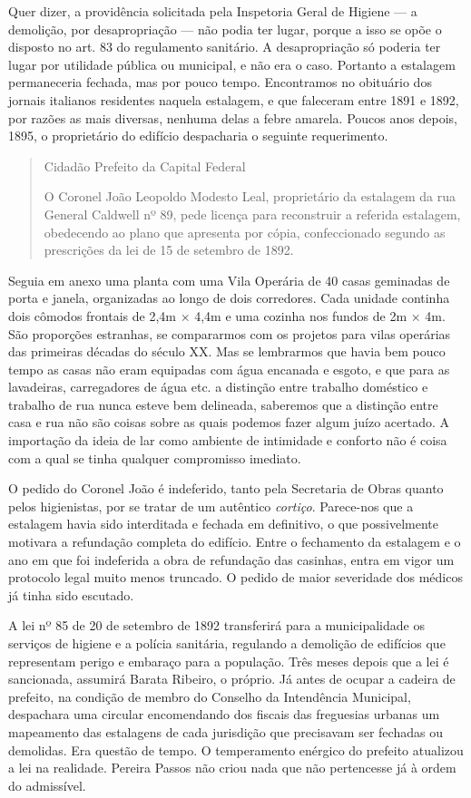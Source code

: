 Quer dizer, a providência solicitada pela Inspetoria Geral de Higiene ---
a demolição, por desapropriação --- não podia ter lugar, porque a isso se
opõe o disposto no art. 83 do regulamento sanitário. A desapropriação só
poderia ter lugar por utilidade pública ou municipal, e não era o caso.
Portanto a estalagem permaneceria fechada, mas por pouco tempo.
Encontramos no obituário dos jornais italianos residentes naquela
estalagem, e que faleceram entre 1891 e 1892, por razões as mais
diversas, nenhuma delas a febre amarela. Poucos anos depois, 1895, o
proprietário do edifício despacharia o seguinte requerimento.

\begin{quote}
Cidadão Prefeito da Capital Federal

O Coronel João Leopoldo Modesto Leal, proprietário da estalagem da rua
General Caldwell nº 89, pede licença para reconstruir a referida
estalagem, obedecendo ao plano que apresenta por cópia, confeccionado
segundo as prescrições da lei de 15 de setembro de 1892.
\end{quote}

Seguia em anexo uma planta com uma Vila Operária de 40 casas geminadas
de porta e janela, organizadas ao longo de dois corredores. Cada unidade
continha dois cômodos frontais de 2,4m × 4,4m e uma cozinha nos fundos
de 2m × 4m. São proporções estranhas, se compararmos com os projetos
para vilas operárias das primeiras décadas do século XX. Mas se
lembrarmos que havia bem pouco tempo as casas não eram equipadas com
água encanada e esgoto, e que para as lavadeiras, carregadores de água
etc. a distinção entre trabalho doméstico e trabalho de rua nunca esteve
bem delineada, saberemos que a distinção entre casa e rua não são coisas
sobre as quais podemos fazer algum juízo acertado. A importação da ideia
de lar como ambiente de intimidade e conforto não é coisa com a qual se
tinha qualquer compromisso imediato.

O pedido do Coronel João é indeferido, tanto pela Secretaria de Obras
quanto pelos higienistas, por se tratar de um autêntico \textit{cortiço}.
Parece-nos que a estalagem havia sido interditada e fechada em
definitivo, o que possivelmente motivara a refundação completa do
edifício. Entre o fechamento da estalagem e o ano em que foi indeferida
a obra de refundação das casinhas, entra em vigor um protocolo legal
muito menos truncado. O pedido de maior severidade dos médicos já tinha
sido escutado.

A lei nº 85 de 20 de setembro de 1892 transferirá para a municipalidade
os serviços de higiene e a polícia sanitária, regulando a demolição de
edifícios que representam perigo e embaraço para a população. Três meses
depois que a lei é sancionada, assumirá Barata Ribeiro, o próprio. Já
antes de ocupar a cadeira de prefeito, na condição de membro do Conselho
da Intendência Municipal, despachara uma circular encomendando dos
fiscais das freguesias urbanas um mapeamento das estalagens de cada
jurisdição que precisavam ser fechadas ou demolidas. Era questão de
tempo. O temperamento enérgico do prefeito atualizou a lei na realidade.
Pereira Passos não criou nada que não pertencesse já à ordem do
admissível.

